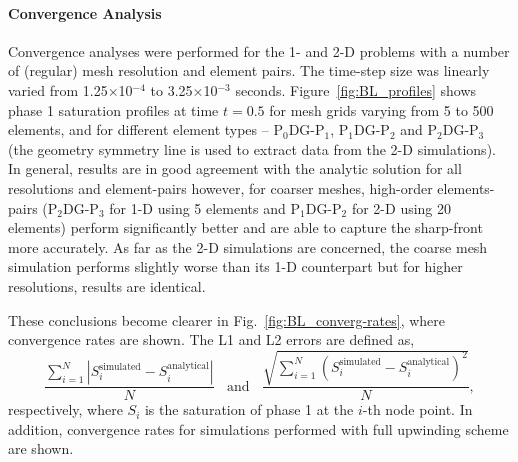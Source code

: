 \documentclass[preprint,authoryear,12pt]{elsarticle}
\newcommand{\PN}[2][error]{P$_{#1}$DG-P$_{#2}$}
\begin{document}
\paragraph{Convergence Analysis}
Convergence analyses were performed for the 1- and 2-D problems with a
number of (regular) mesh resolution and element pairs. The time-step
size was linearly varied from 1.25$\times$10$^{-4}$ to
3.25$\times$10$^{-3}$ seconds. Figure~\ref{fig:BL_profiles} shows
phase 1 saturation profiles at time $t=0.5$ for mesh grids varying
from 5 to 500 elements, and for different element types -- \PN[0]{1},
\PN[1]{2} and \PN[2]{3} (the geometry symmetry line is used to extract
data from the 2-D simulations).  In general, results are in good
agreement with the analytic solution for all resolutions and
element-pairs however, for coarser meshes, high-order elements-pairs
(\PN[2]{3} for 1-D using 5 elements and \PN[1]{2} for 2-D using 20
elements) perform significantly better and are able to capture the
sharp-front more accurately. As far as the 2-D simulations are
concerned, the coarse mesh simulation performs slightly worse than its
1-D counterpart but for higher resolutions, results are identical.

These conclusions become clearer in Fig.~\ref{fig:BL_converg-rates},
where convergence rates are shown. The L1 and L2 errors are defined
as,
\begin{displaymath}
  \displaystyle\frac{\sum\limits_{i=1}^{N}\left|S_{i}^{\text{simulated}}
    - S_{i}^{\text{analytical}}\right|}{N}\;\;\text{ and }\;\;
  \displaystyle\frac{\sqrt{
      \sum\limits_{i=1}^{N}{\left(S_{i}^{\text{simulated}} -
        S_{i}^{\text{analytical}}\right)^{2}}}}{N},
\end{displaymath}
respectively, where $S_i$ is the saturation of phase 1 at the $i$-th
node point. In addition, convergence rates for simulations performed
with full upwinding scheme are shown.


\end{document}
